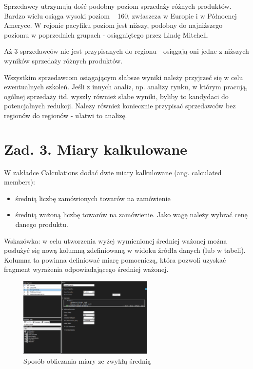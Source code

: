 \documentclass[a4paper,12pt]{article}
\begin{document}
Sprzedawcy utrzymują dość podobny poziom sprzedaży różnych produktów. Bardzo wielu osiąga wysoki poziom ~ 160, zwłaszcza w Europie i w Północnej Ameryce. W rejonie pacyfiku poziom jest niższy, podobny do najniższego poziomu w poprzednich grupach - osiągniętego przez Lindę Mitchell.

Aż 3 sprzedawców nie jest przypisanych do regionu - osiągają oni jedne z niższych wyników sprzedaży różnych produktów.

Wszystkim sprzedawcom osiągającym słabsze wyniki należy przyjrzeć się w celu ewentualnych szkoleń. Jeśli z innych analiz, np. analizy rynku, w którym pracują, ogólnej sprzedaży itd. wyszły również słabe wyniki, byliby to kandydaci do potencjalnych redukcji. Nalezy również koniecznie przypisać sprzedawców bez regionów do regionów - ułatwi to analizę.

\section{Zad. 3. Miary kalkulowane}

W zakładce Calculations dodać dwie miary kalkulowane (ang. calculated members):\begin{itemize}
  \item średnią liczbę zamówionych towarów na zamówienie
  \item średnią ważoną liczbę towarów na zamówienie. Jako wagę należy wybrać cenę danego produktu.
\end{itemize}
Wskazówka: w celu utworzenia wyżej wymienionej średniej ważonej można posłużyć się nową
kolumną zdefiniowaną w widoku źródła danych (lub w tabeli). Kolumna ta powinna definiować
miarę pomocniczą, która pozwoli uzyskać fragment wyrażenia odpowiadającego średniej
ważonej.

\begin{figure}[H]
  \centering
  \includegraphics[width=0.6\textwidth]{3_calculations_1.png}
  \caption{Sposób obliczania miary ze zwykłą średnią}
\end{figure}
\end{document}
